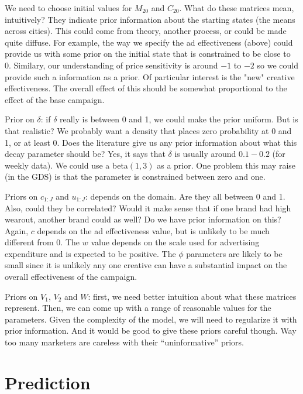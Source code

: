 \documentclass[letter,10pt]{article}
\begin{document}
We need to choose initial values for $M_{20}$ and $C_{20}$.  What do
these matrices mean, intuitively?  They indicate prior information about the
starting states (the means across cities).  This could come from theory, another process, or could be made
quite diffuse.  For example, the way we specify the ad effectiveness (above) 
could provide us with some prior on the initial state that is constrained to be 
close to 0.  Similary, our understanding of price sensitivity is around $-1$ to $-2$
so we could provide such a information as a prior.   Of particular interest is
the "new" creative effectiveness.  The overall effect of this should be 
somewhat proportional to the effect of the base campaign.  

Prior on $\delta$:  if $\delta$ really is between 0 and 1, we could
make the prior uniform.  But is that realistic?  We probably want a
density that places zero probability at 0 and 1, or at least 0.  Does
the literature give us any prior information about what this decay
parameter should be?  Yes, it says that $\delta$ is usually around $0.1-0.2$ (for
weekly data).  We could use a beta$(1,3)$ as a prior.  One problem this
may raise (in the GDS) is that the parameter is constrained between zero and
one.  

Priors on $c_{1:J}$ and $u_{1:J}$:  depends on the domain.  Are they
all between 0 and 1.  Also, could they be correlated?  Would it make
sense that if one brand had high wearout, another brand could as well?
Do we have prior information on this?  Again, $c$ depends on the 
ad effectiveness value, but is unlikely to be much different from 0.  
The $w$ value depends on the scale used for advertising expenditure
and is expected to be positive.    The $\phi$ parameters are likely to be small
since it is unlikely any one creative can have a substantial impact on the 
overall effectiveness of the campaign.  

Priors on $V_1$, $V_2$ and $W$:  first, we need better intuition about
what these matrices represent.  Then, we can come up with a range of
reasonable values for the parameters.  Given the complexity of the
model, we will need to regularize it with prior information.  And it
would be good to give these priors careful though.  Way too many
marketers are careless with their ``uninformative'' priors.

\section*{Prediction}
\end{document}
